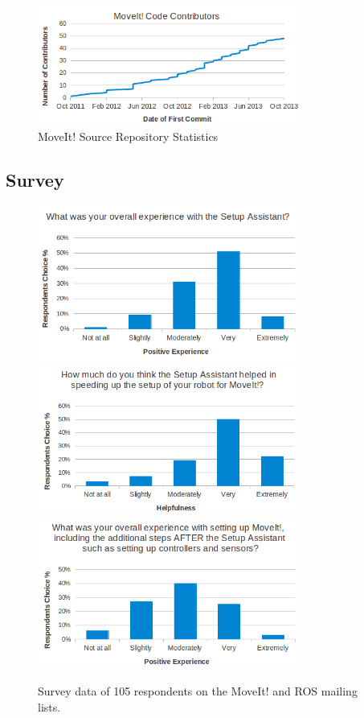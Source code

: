 \documentclass[10pt,journal,compsoc]{joser1}
\begin{document}
{\begin{figure}[!t]
\centering
\includegraphics[width=3.4in]{images/moveit_contributors}
\caption{MoveIt! Source Repository Statistics}
\label{fig:contributors}
\end{figure}

\subsection{Survey}
\label{sec::survey}

\begin{figure}[!t]
\centering
\includegraphics[width=3.4in]{images/setup_assistant_positive}
\includegraphics[width=3.4in]{images/sa_speedup}
\includegraphics[width=3.4in]{images/moveit_after_sa}
\caption{Survey data of 105 respondents on the MoveIt! and ROS mailing lists.}
\label{fig:setup_assistant_positive}
\end{figure} 

}
\end{document}
